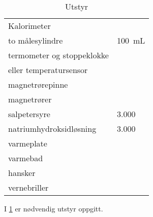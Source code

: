 	\begin{table}[H]
		\caption{Utstyr}
		\begin{tabular}{ll}
			\toprule
			Kalorimeter & \\
			to målesylindre & \SI{100}{\milli\liter} \\
			termometer og stoppeklokke & \\ 
			eller temperatursensor & \\
			magnetrørepinne & \\
			magnetrører & \\
			salpetersyre & \SI{3.000}{\molar} \\
			natriumhydroksidløsning & \SI{3.000}{\molar} \\
			varmeplate & \\
			varmebad & \\
			hansker & \\
			vernebriller & \\ 
			\bottomrule 
		\end{tabular}
		\label{tbl:equipment}
	\end{table}
	
	I \cref{tbl:equipment} er nødvendig utstyr oppgitt.
	
